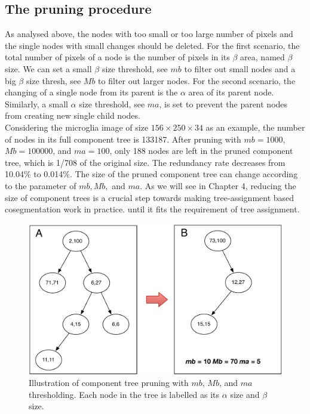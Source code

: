\subsection{The pruning procedure}
As analysed above, the nodes with too small or too large number of pixels and the single nodes with small changes should be deleted. For the first scenario, the total number of pixels of a node is the number of pixels in its $\beta$ area, named $\beta$ size. We can set a small $\beta$ size threshold, see $mb$ to filter out small nodes and a big $\beta$ size thresh, see $Mb$ to filter out larger nodes. For the second scenario, the changing of a single node from its parent is the $\alpha$ area of its parent node. Similarly, a small $\alpha$ size threshold, see $ma$, is set to prevent the parent nodes from creating new single child nodes.\\
Considering the microglia image of size $156\times250\times34$ as an example, the number of nodes in its full component tree is 133187. After pruning with $mb = 1000$, $Mb = 100000$, and $ ma = 100$, only 188 nodes are left in the pruned component tree, which is 1/708 of the original size. The redundancy rate decreases from 10.04\% to 0.014\%. The size of the pruned component tree can change according to the parameter of $mb, Mb,$ and $ma$. As we will see in Chapter 4, reducing the size of component trees is a crucial step towards making tree-assignment based cosegmentation work in practice. until it fits the requirement of tree assignment.

\begin{figure}[htbp]
\centering
\includegraphics[width=1.0\textwidth]{images/cptree_pruning}
\caption[Demo of component tree pruning]{Illustration of component tree pruning with $mb$, $Mb$, and $ma$ thresholding. Each node in the tree is labelled as its $\alpha$ size and $\beta$ size.}
\label{fig:cptree-pruning}
\end{figure}

